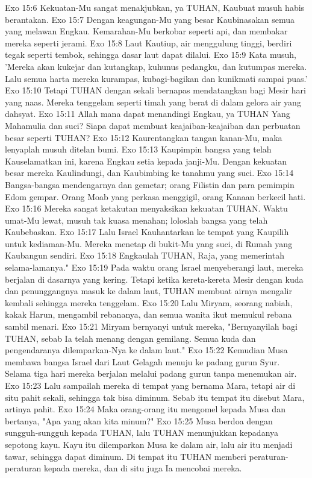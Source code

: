 Exo 15:6  Kekuatan-Mu sangat menakjubkan, ya TUHAN, Kaubuat musuh habis berantakan.
Exo 15:7  Dengan keagungan-Mu yang besar Kaubinasakan semua yang melawan Engkau. Kemarahan-Mu berkobar seperti api, dan membakar mereka seperti jerami.
Exo 15:8  Laut Kautiup, air menggulung tinggi, berdiri tegak seperti tembok, sehingga dasar laut dapat dilalui.
Exo 15:9  Kata musuh, 'Mereka akan kukejar dan kutangkap, kuhunus pedangku, dan kutumpas mereka. Lalu semua harta mereka kurampas, kubagi-bagikan dan kunikmati sampai puas.'
Exo 15:10  Tetapi TUHAN dengan sekali bernapas mendatangkan bagi Mesir hari yang naas. Mereka tenggelam seperti timah yang berat di dalam gelora air yang dahsyat.
Exo 15:11  Allah mana dapat menandingi Engkau, ya TUHAN Yang Mahamulia dan suci? Siapa dapat membuat keajaiban-keajaiban dan perbuatan besar seperti TUHAN?
Exo 15:12  Kaurentangkan tangan kanan-Mu, maka lenyaplah musuh ditelan bumi.
Exo 15:13  Kaupimpin bangsa yang telah Kauselamatkan ini, karena Engkau setia kepada janji-Mu. Dengan kekuatan besar mereka Kaulindungi, dan Kaubimbing ke tanahmu yang suci.
Exo 15:14  Bangsa-bangsa mendengarnya dan gemetar; orang Filistin dan para pemimpin Edom gempar. Orang Moab yang perkasa menggigil, orang Kanaan berkecil hati.
Exo 15:16  Mereka sangat ketakutan menyaksikan kekuatan TUHAN. Waktu umat-Mu lewat, musuh tak kuasa menahan; loloslah bangsa yang telah Kaubebaskan.
Exo 15:17  Lalu Israel Kauhantarkan ke tempat yang Kaupilih untuk kediaman-Mu. Mereka menetap di bukit-Mu yang suci, di Rumah yang Kaubangun sendiri.
Exo 15:18  Engkaulah TUHAN, Raja, yang memerintah selama-lamanya."
Exo 15:19  Pada waktu orang Israel menyeberangi laut, mereka berjalan di dasarnya yang kering. Tetapi ketika kereta-kereta Mesir dengan kuda dan penunggangnya masuk ke dalam laut, TUHAN membuat airnya mengalir kembali sehingga mereka tenggelam.
Exo 15:20  Lalu Miryam, seorang nabiah, kakak Harun, mengambil rebananya, dan semua wanita ikut memukul rebana sambil menari.
Exo 15:21  Miryam bernyanyi untuk mereka, "Bernyanyilah bagi TUHAN, sebab Ia telah menang dengan gemilang. Semua kuda dan pengendaranya dilemparkan-Nya ke dalam laut."
Exo 15:22  Kemudian Musa membawa bangsa Israel dari Laut Gelagah menuju ke padang gurun Syur. Selama tiga hari mereka berjalan melalui padang gurun tanpa menemukan air.
Exo 15:23  Lalu sampailah mereka di tempat yang bernama Mara, tetapi air di situ pahit sekali, sehingga tak bisa diminum. Sebab itu tempat itu disebut Mara, artinya pahit.
Exo 15:24  Maka orang-orang itu mengomel kepada Musa dan bertanya, "Apa yang akan kita minum?"
Exo 15:25  Musa berdoa dengan sungguh-sungguh kepada TUHAN, lalu TUHAN menunjukkan kepadanya sepotong kayu. Kayu itu dilemparkan Musa ke dalam air, lalu air itu menjadi tawar, sehingga dapat diminum. Di tempat itu TUHAN memberi peraturan-peraturan kepada mereka, dan di situ juga Ia mencobai mereka.
